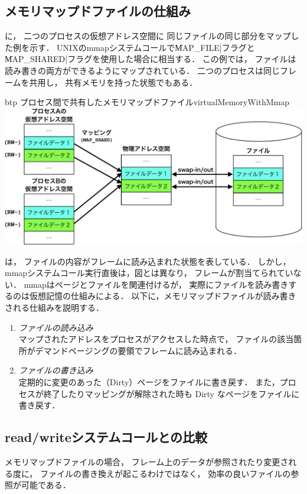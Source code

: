 \subsection{メモリマップドファイルの仕組み}
に，
二つのプロセスの仮想アドレス空間に
同じファイルの同じ部分をマップした例を示す．
UNIXのmmapシステムコールで\|MAP_FILE|フラグと
\|MAP_SHARED|フラグを使用した場合に相当する．
この例では，
ファイルは読み書きの両方ができるようにマップされている．
二つのプロセスは同じフレームを共用し，
共有メモリを持った状態でもある．

\begin{myfig}{btp}
  {プロセス間で共有したメモリマップドファイル}{virtualMemoryWithMmap}
  \includegraphics[scale=0.66]{Fig/virtualMemoryWithMmap-crop.pdf}
\end{myfig}

は，
ファイルの内容がフレームに読み込まれた状態を表している．
しかし，mmapシステムコール実行直後は，図とは異なり，
フレームが割当てられていない．
mmapはページとファイルを関連付けるが，
実際にファイルを読み書きするのは仮想記憶の仕組みによる．
以下に，メモリマップドファイルが読み書きされる仕組みを説明する．

\begin{enumerate}
\item \emph{ファイルの読み込み} \\
  マップされたアドレスをプロセスがアクセスした時点で，
  ファイルの該当箇所がデマンドページングの要領でフレームに読み込まれる．
\item \emph{ファイルの書き込み} \\
  定期的に変更のあった（Dirty）ページをファイルに書き戻す．
  また，プロセスが終了したりマッピングが解除された時も
  Dirty なページをファイルに書き戻す．
\end{enumerate}

\subsection{read/writeシステムコールとの比較}
メモリマップドファイルの場合，
フレーム上のデータが参照されたり変更される度に，
ファイルの書き換えが起こるわけではなく，
効率の良いファイルの参照が可能である．

